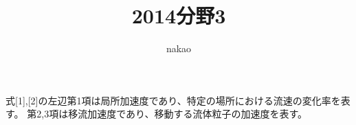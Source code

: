 \documentclass[a4paper]{jsarticle}
\begin{document}
\title{2014分野3}
\author{nakao}
\maketitle

\section{}
\subsection{}
式[1],[2]の左辺第1項は局所加速度であり、特定の場所における流速の変化率を表す。
第2,3項は移流加速度であり、移動する流体粒子の加速度を表す。
\end{document}
